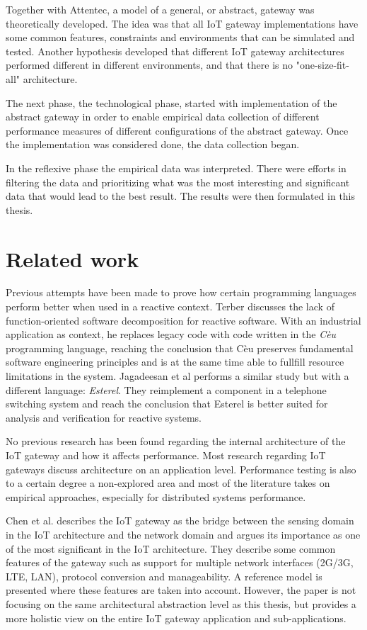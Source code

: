Together with Attentec, a model of a general, or abstract, gateway was
theoretically developed. The idea was that all IoT gateway implementations have
some common features, constraints and environments that can be simulated and
tested. Another hypothesis developed that different IoT gateway architectures
performed different in different environments, and that there is no
"one-size-fit-all" architecture.

The next phase, the technological phase, started with implementation of the
abstract gateway in order to enable empirical data collection of different
performance measures of different configurations of the abstract gateway. Once
the implementation was considered done, the data collection began.

In the reflexive phase the empirical data was interpreted. There were efforts
in filtering the data and prioritizing what was the most interesting and
significant data that would lead to the best result. The results were then
formulated in this thesis.

\section{Related work}

Previous attempts have been made to prove how certain programming languages
perform better when used in a reactive context. Terber
\cite{terber2017function} discusses the lack of function-oriented software
decomposition for reactive software. With an industrial application as context,
he replaces legacy code with code written in the \textit{Cèu} programming
language, reaching the conclusion that Cèu preserves fundamental software
engineering principles and is at the same time able to fullfill resource
limitations in the system. Jagadeesan et al \cite{jagadeesan1996formal}
performs a similar study but with a different language: \textit{Esterel}. They
reimplement a component in a telephone switching system and reach the
conclusion that Esterel is better suited for analysis and verification for
reactive systems.

No previous research has been found regarding the internal architecture of the
IoT gateway and how it affects performance. Most research regarding IoT
gateways discuss architecture on an application level. Performance testing is
also to a certain degree a non-explored area and most of the literature takes
on empirical approaches, especially for distributed systems performance.

Chen et al. \cite{chen2011brief} describes the IoT gateway as the bridge
between the sensing domain in the IoT architecture and the network domain and
argues its importance as one of the most significant in the IoT architecture.
They describe some common features of the gateway such as support for multiple
network interfaces (2G/3G, LTE, LAN), protocol conversion and manageability. A
reference model is presented where these features are taken into account.
However, the paper is not focusing on the same architectural abstraction level
as this thesis, but provides a more holistic view on the entire IoT gateway
application and sub-applications.


